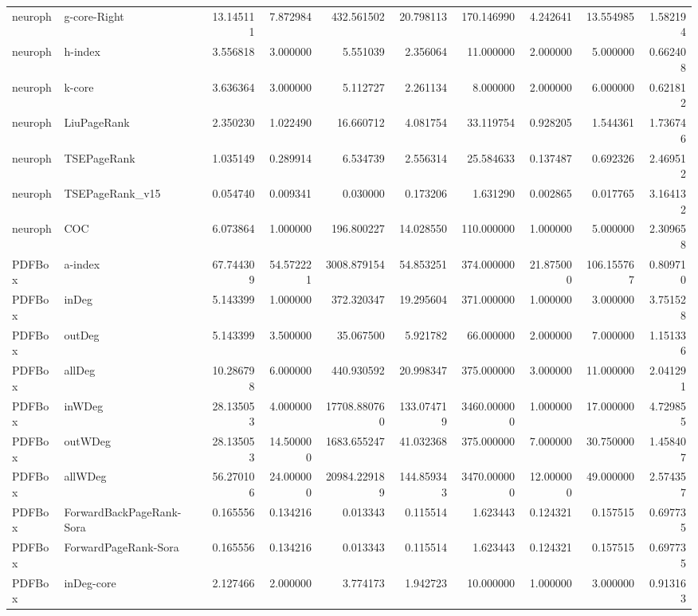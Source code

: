 \begin{tabular}{llrrrrrrrr}
neuroph & g-core-Right & 13.145111 & 7.872984 & 432.561502 & 20.798113 & 170.146990 & 4.242641 & 13.554985 & 1.582194 \\
neuroph & h-index & 3.556818 & 3.000000 & 5.551039 & 2.356064 & 11.000000 & 2.000000 & 5.000000 & 0.662408 \\
neuroph & k-core & 3.636364 & 3.000000 & 5.112727 & 2.261134 & 8.000000 & 2.000000 & 6.000000 & 0.621812 \\
neuroph & LiuPageRank & 2.350230 & 1.022490 & 16.660712 & 4.081754 & 33.119754 & 0.928205 & 1.544361 & 1.736746 \\
neuroph & TSEPageRank & 1.035149 & 0.289914 & 6.534739 & 2.556314 & 25.584633 & 0.137487 & 0.692326 & 2.469512 \\
neuroph & TSEPageRank_v15 & 0.054740 & 0.009341 & 0.030000 & 0.173206 & 1.631290 & 0.002865 & 0.017765 & 3.164132 \\
neuroph & COC & 6.073864 & 1.000000 & 196.800227 & 14.028550 & 110.000000 & 1.000000 & 5.000000 & 2.309658 \\
PDFBox & a-index & 67.744309 & 54.572221 & 3008.879154 & 54.853251 & 374.000000 & 21.875000 & 106.155767 & 0.809710 \\
PDFBox & inDeg & 5.143399 & 1.000000 & 372.320347 & 19.295604 & 371.000000 & 1.000000 & 3.000000 & 3.751528 \\
PDFBox & outDeg & 5.143399 & 3.500000 & 35.067500 & 5.921782 & 66.000000 & 2.000000 & 7.000000 & 1.151336 \\
PDFBox & allDeg & 10.286798 & 6.000000 & 440.930592 & 20.998347 & 375.000000 & 3.000000 & 11.000000 & 2.041291 \\
PDFBox & inWDeg & 28.135053 & 4.000000 & 17708.880760 & 133.074719 & 3460.000000 & 1.000000 & 17.000000 & 4.729855 \\
PDFBox & outWDeg & 28.135053 & 14.500000 & 1683.655247 & 41.032368 & 375.000000 & 7.000000 & 30.750000 & 1.458407 \\
PDFBox & allWDeg & 56.270106 & 24.000000 & 20984.229189 & 144.859343 & 3470.000000 & 12.000000 & 49.000000 & 2.574357 \\
PDFBox & ForwardBackPageRank-Sora & 0.165556 & 0.134216 & 0.013343 & 0.115514 & 1.623443 & 0.124321 & 0.157515 & 0.697735 \\
PDFBox & ForwardPageRank-Sora & 0.165556 & 0.134216 & 0.013343 & 0.115514 & 1.623443 & 0.124321 & 0.157515 & 0.697735 \\
PDFBox & inDeg-core & 2.127466 & 2.000000 & 3.774173 & 1.942723 & 10.000000 & 1.000000 & 3.000000 & 0.913163 \\

\end{tabular}
